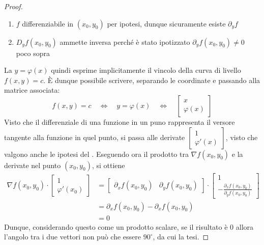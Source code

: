 \begin{proposition}
\begin{proof}
\begin{note}
\begin{enumerate}
				\item $f$ differenziabile in $(x_0, y_0)$ per ipotesi, dunque sicuramente esiste $\partial_y f$
				\item $D_yf(x_0, y_0)$ ammette inversa perché è stato ipotizzato $\partial_y f(x_0,y_0) \neq 0$ poco sopra
			\end{enumerate}
		\end{note}
		La $y = \varphi(x)$ quindi esprime implicitamente il vincolo della curva di livello $f(x, y) = c$. È dunque possibile scrivere, separando le coordinate e passando alla matrice associata:
		\[
			f(x, y) = c \quad \iff \quad y = \varphi(x) \quad \iff \quad
			\begin{bmatrix}
				x\\
				\varphi(x)
			\end{bmatrix}
		\]
		Visto che il differenziale di una funzione in un puno rappresenta il versore tangente alla funzione in quel punto, si passa alle derivate $\begin{bmatrix}1\\\varphi'(x)\end{bmatrix}$, visto che valgono anche le ipotesi del . Eseguendo ora il prodotto tra $\nabla f(x_0, y_0)$ e la derivate nel punto $(x_0, y_0)$, si ottiene
		\begin{align*}
			\nabla f(x_0, y_0) \cdot \begin{bmatrix}1\\\varphi'(x_0)\end{bmatrix}
			&= \begin{bmatrix}
				\partial_x f(x_0, y_0) & \partial_y f(x_0, y_0)
			\end{bmatrix}
			\cdot
			\begin{bmatrix}
				1\\
				-\frac{\partial_x f(x_0, y_0)}{\partial_y f(x_0, y_0)}
			\end{bmatrix}\\
			&= \partial_x f(x_0, y_0) - \partial_x f(x_0, y_0)\\
			&= 0
		\end{align*}
		Dunque, considerando questo come un prodotto scalare, se il risultato è $0$ allora l'angolo tra i due vettori non può che essere $90^\circ$, da cui la tesi.
	\end{proof}
\end{proposition}

